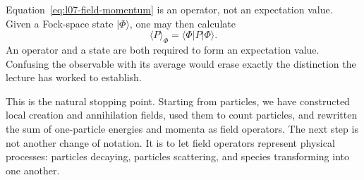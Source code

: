 Equation~\eqref{eq:l07-field-momentum} is an operator, not an expectation value. Given a Fock-space state \(|\Phi\rangle\), one may then calculate
\begin{equation}
\langle P\rangle_\Phi=\langle\Phi|P|\Phi\rangle.
\end{equation}
An operator and a state are both required to form an expectation value. Confusing the observable with its average would erase exactly the distinction the lecture has worked to establish.

\begin{classroomqa}
\end{classroomqa}

This is the natural stopping point. Starting from particles, we have constructed local creation and annihilation fields, used them to count particles, and rewritten the sum of one-particle energies and momenta as field operators. The next step is not another change of notation. It is to let field operators represent physical processes: particles decaying, particles scattering, and species transforming into one another.
